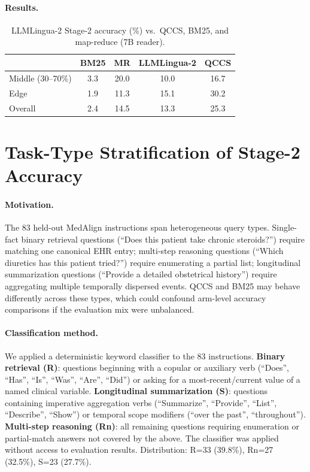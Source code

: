 \documentclass{article}
\begin{document}
\paragraph{Results.}

\begin{table}[H]
\centering
\caption{LLMLingua-2 Stage-2 accuracy (\%) vs.\ QCCS, BM25, and map-reduce (7B reader).}
\label{tab:llmlingua2}
\small
\begin{tabular}{@{}lcccc@{}}
\toprule
 & BM25 & MR & LLMLingua-2 & QCCS \\
\midrule
Middle (30--70\%) & 3.3 & 20.0 & 10.0 & 16.7 \\
Edge              & 1.9 & 11.3 & 15.1 & 30.2 \\
Overall           & 2.4 & 14.5 & 13.3 & 25.3 \\
\bottomrule
\end{tabular}
\end{table}


\section{Task-Type Stratification of Stage-2 Accuracy}
\label{app:tasktype}

\paragraph{Motivation.}
The 83 held-out MedAlign instructions span heterogeneous query types.
Single-fact binary retrieval questions (``Does this patient take chronic steroids?'')
require matching one canonical EHR entry; multi-step reasoning questions
(``Which diuretics has this patient tried?'') require enumerating a partial list;
longitudinal summarization questions (``Provide a detailed obstetrical history'')
require aggregating multiple temporally dispersed events. QCCS and BM25 may
behave differently across these types, which could confound arm-level accuracy
comparisons if the evaluation mix were unbalanced.

\paragraph{Classification method.}
We applied a deterministic keyword classifier to the 83 instructions.
\textbf{Binary retrieval (R)}: questions beginning with a copular or auxiliary
verb (``Does'', ``Has'', ``Is'', ``Was'', ``Are'', ``Did'') or asking for
a most-recent/current value of a named clinical variable.
\textbf{Longitudinal summarization (S)}: questions containing imperative
aggregation verbs (``Summarize'', ``Provide'', ``List'', ``Describe'',
``Show'') or temporal scope modifiers (``over the past'', ``throughout'').
\textbf{Multi-step reasoning (Rn)}: all remaining questions requiring
enumeration or partial-match answers not covered by the above.
The classifier was applied without access to evaluation results.
Distribution: R=33 (39.8\%), Rn=27 (32.5\%), S=23 (27.7\%).
\end{document}
